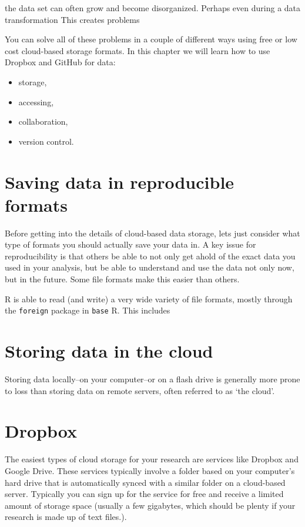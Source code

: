 \documentclass[ChapterTOCs,krantz1]{krantz}\usepackage{graphicx, color}
\begin{document}
the data set can often grow and become disorganized. Perhaps even during
a data transformation This creates problems

You can solve all of these problems in a couple of different ways using
free or low cost cloud-based storage formats. In this chapter we will
learn how to use Dropbox and GitHub for data:

\begin{itemize}
    \item storage,
    \item accessing,
    \item collaboration,
    \item version control.
\end{itemize}

\section{Saving data in reproducible formats}

Before getting into the details of cloud-based data storage, lets just
consider what type of formats you should actually save your data in. A
key issue for reproducibility is that others be able to not only get
ahold of the exact data you used in your analysis, but be able to
understand and use the data not only now, but in the future. Some file
formats make this easier than others.

R is able to read (and write) a very wide variety of file
formats, mostly through the \texttt{foreign} package in \texttt{base}
R. This includes

\section{Storing data in the cloud}

Storing data locally--on your computer--or on a flash drive is generally
more prone to loss than storing data on remote servers, often referred
to as `the cloud'.

\section{Dropbox}

The easiest types of cloud storage for your research are services like
Dropbox and Google Drive. These services typically
involve a folder based on your computer's hard drive that is
automatically synced with a similar folder on a cloud-based server.
Typically you can sign up for the service for free and receive a limited
amount of storage space (usually a few gigabytes, which should be plenty
if your research is made up of text files.).
\end{document}

